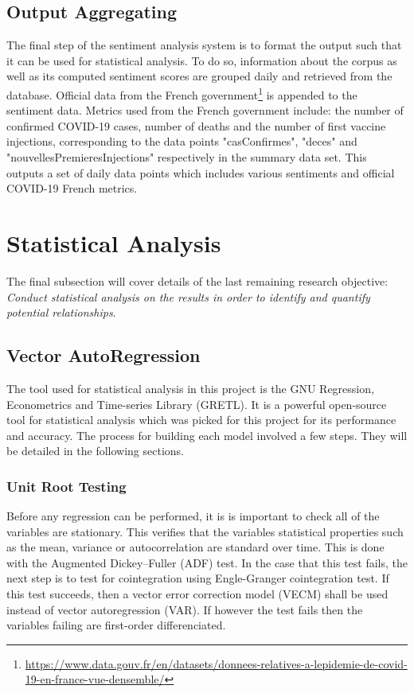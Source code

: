 \subsection{Output Aggregating}\label{chap: output aggregating}

The final step of the sentiment analysis system is to format the output such that it can be used for statistical analysis. To do so, information about the corpus as well as its computed sentiment scores are grouped daily and retrieved from the database. Official data from the French government\footnote{\url{https://www.data.gouv.fr/en/datasets/donnees-relatives-a-lepidemie-de-covid-19-en-france-vue-densemble/}} is appended to the sentiment data. Metrics used from the French government include: the number of confirmed COVID-19 cases, number of deaths and the number of first vaccine injections, corresponding to the data points "casConfirmes", "deces" and "nouvellesPremieresInjections" respectively in the summary data set. This outputs a set of daily data points which includes various sentiments and official COVID-19 French metrics.

\section{Statistical Analysis}\label{chap: stat analysis}

The final subsection will cover details of the last remaining research objective: \emph{Conduct statistical analysis on the results in order to identify and quantify potential relationships}.

\subsection{Vector AutoRegression}

The tool used for statistical analysis in this project is the GNU Regression, Econometrics and Time-series Library (GRETL). It is a powerful open-source tool for statistical analysis which was picked for this project for its performance and accuracy. The process for building each model involved a few steps. They will be detailed in the following sections.

\subsubsection{Unit Root Testing}

Before any regression can be performed, it is is important to check all of the variables are stationary. This verifies that the variables statistical properties such as the mean, variance or autocorrelation are standard over time. This is done with the Augmented Dickey–Fuller (ADF) test. In the case that this test fails, the next step is to test for cointegration using Engle-Granger cointegration test. If this test succeeds, then a vector error correction model (VECM) shall be used instead of vector autoregression (VAR). If however the test fails then the variables failing are first-order differenciated.

